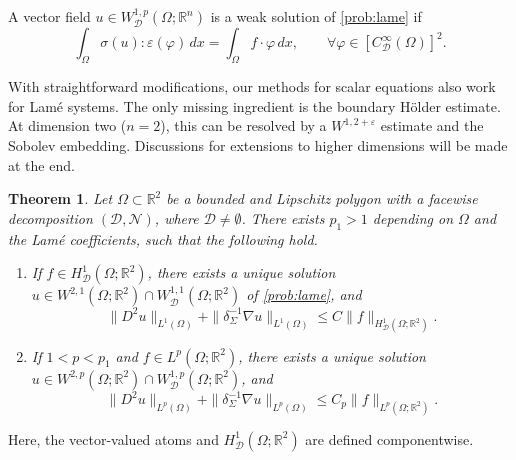 \documentclass[12pt]{amsart}
\newtheorem{theorem}{Theorem}[section]
\numberwithin{equation}{section}
\newcommand{\bR}{\mathbb{R}}
\newcommand\cD{\mathcal{D}}
\newcommand\cN{\mathcal{N}}
\newcommand{\epsi}{\varepsilon}
\begin{document}
A vector field $u\in W^{1,p}_{\cD}(\Omega;\bR^n)$ is a weak solution of
\eqref{prob:lame} if
\begin{equation}
 \int_\Omega \sigma(u):\varepsilon(\varphi)\,dx
 =\int_\Omega f\cdot\varphi\,dx,
 \qquad
 \forall\varphi\in [C^\infty_{\cD}(\Omega)]^2.
 \label{eq:lame-weak}
\end{equation}

With straightforward modifications, our methods for scalar equations also work for Lam\'e systems. The only missing ingredient is the boundary H\"older estimate. At dimension two ($n=2$), this can be resolved by a $W^{1,2+\epsi}$ estimate and the Sobolev embedding. Discussions for extensions to higher dimensions will be made at the end.


\begin{theorem}
 \label{thm:lame-polygon}
 Let $\Omega\subset\bR^2$ be a bounded and Lipschitz polygon with a facewise decomposition $(\cD,\cN)$, where $\cD\neq\emptyset$.
 There exists $p_1 > 1$ depending on $\Omega$ and the Lam\'e coefficients, such that the following hold.
 \begin{enumerate}
  \item If $f\in H^1_{\cD}(\Omega;\bR^2)$, there exists a unique solution $u\in W^{2,1}(\Omega;\bR^2)\cap W^{1,1}_{\cD}(\Omega;\bR^2)$ of \eqref{prob:lame}, and
  \begin{equation}
   \|D^2u\|_{L^1(\Omega)}
   +\|\delta_\Sigma^{-1}\nabla u\|_{L^1(\Omega)}
   \leq C\|f\|_{H^1_{\cD}(\Omega;\bR^2)}.
   \label{eq:lame-hardy-estimate}
  \end{equation}
  \item If $1<p<p_1$ and $f\in L^p(\Omega;\bR^2)$, there exists a unique
  solution $u\in W^{2,p}(\Omega;\bR^2)\cap W^{1,p}_{\cD}(\Omega;\bR^2)$, and
  \begin{equation}
   \|D^2u\|_{L^p(\Omega)}
   +\|\delta_\Sigma^{-1}\nabla u\|_{L^p(\Omega)}
   \leq C_p\|f\|_{L^p(\Omega;\bR^2)}.
   \label{eq:lame-Lp-estimate}
  \end{equation}
 \end{enumerate}
\end{theorem}
Here, the vector-valued atoms and $H^1_\cD(\Omega ; \bR^2)$ are defined componentwise.
\end{document}
